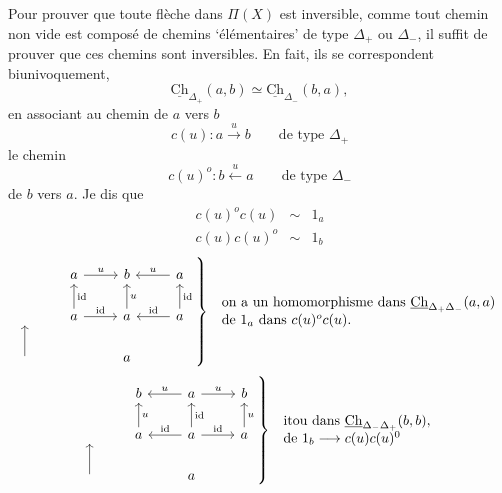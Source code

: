 \documentclass[11pt]{article}
\newcommand{\printedpage}[1]{\marginpar{\footnotesize p.~#1}}
\newcommand{\msp}[1]{\marginpar{\footnotesize [#1]}}
\newcommand{\Ch}{\underline{\mathrm{Ch}}}
\begin{document}
\printedpage{42}
\msp{page 63}
Pour prouver que toute flèche dans $\Pi(X)$ est inversible, comme tout chemin non vide est composé de chemins `élémentaires' de type $\Delta_+$ ou $\Delta_-$, il suffit de prouver que ces chemins sont inversibles. En fait, ils se correspondent biunivoquement,
\[
\Ch_{\Delta_+}(a,b) \simeq \Ch_{\Delta_-}(b,a),
\]
en associant au chemin de $a$ vers $b$
\[
c(u) : a \xrightarrow{u} b \qquad \text{de type } \Delta_+
\]
le chemin
\[
c(u)^o : b \xleftarrow{u} a \qquad \text{de type } \Delta_-
\]
de $b$ vers $a$. Je dis que
\[
\begin{array}{rcl}
c(u)^o c(u) & \sim & 1_a\\
c(u) c(u)^o & \sim & 1_b
\end{array}
\]
\[
\left.
\begin{tikzcd}
 & a \arrow[r, "u"] & b & a \arrow[l, "u"'] \\
 {} & a \arrow[u, "\mathrm{id}"'] \arrow[r, "\mathrm{id}"] & a \arrow[u, "u"'] & a \arrow[u, "\mathrm{id}"'] \arrow[l, "\mathrm{id}"'] \\
 {} \arrow[u] & & a &
\end{tikzcd}
\right\}\
\begin{array}{l}
\text{on a un homomorphisme dans } \Ch_{\Delta_+\Delta_-}(a,a)\\
\text{de } 1_a \text{ dans } c(u)^o c(u).
\end{array}
\]
\[
\left.
\begin{tikzcd}
 & b & a \arrow[l, "u"'] \arrow[r, "u"] & b \\
 {} & a \arrow[u, "u"'] & a \arrow[u, "\mathrm{id}"'] \arrow[l, "\mathrm{id}"'] \arrow[r, "\mathrm{id}"] & a \arrow[u, "u"'] \\
 {} \arrow[u] & & a &
\end{tikzcd}
\right\}\
\begin{array}{l}
\text{itou dans } \Ch_{\Delta_-\Delta_+}(b,b),\\
\text{de } 1_b \longrightarrow c(u)c(u)^0 %
\end{array}
\]
\end{document}
